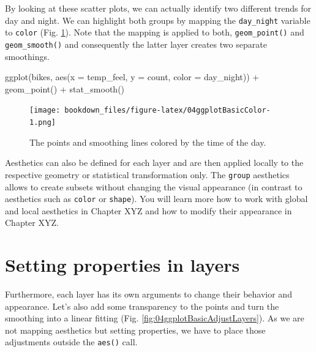 \documentclass[
]{krantz}
\makeatletter
\newenvironment{Shaded}{\begin{snugshade}}{\end{snugshade}}
\newcommand{\AttributeTok}[1]{\textcolor[rgb]{0.61,0.61,0.61}{#1}}
\newcommand{\FunctionTok}[1]{\textcolor[rgb]{0,0,0}{#1}}
\newcommand{\NormalTok}[1]{#1}
\newcommand{\SpecialCharTok}[1]{\textcolor[rgb]{0,0,0}{#1}}
\newenvironment{kframe}{%
\medskip{}
\setlength{\fboxsep}{.8em}
 \def\at@end@of@kframe{}%
 \ifinner\ifhmode%
  \def\at@end@of@kframe{\end{minipage}}%
  \begin{minipage}{\columnwidth}%
 \fi\fi%
 \def\FrameCommand##1{\hskip\@totalleftmargin \hskip-\fboxsep
 \colorbox{shadecolor}{##1}\hskip-\fboxsep
     \hskip-\linewidth \hskip-\@totalleftmargin \hskip\columnwidth}%
 \MakeFramed {\advance\hsize-\width
   \@totalleftmargin\z@ \linewidth\hsize
   \@setminipage}}%
 {\par\unskip\endMakeFramed%
 \at@end@of@kframe}
\renewenvironment{Shaded}{\begin{kframe}}{\end{kframe}}
\makeatother
\begin{document}
By looking at these scatter plots, we can actually identify two different trends for day and night. We can highlight both groups by mapping the \texttt{day\_night} variable to \texttt{color} (Fig. \ref{fig:04ggplotBasicColor}). Note that the mapping is applied to both, \texttt{geom\_point()} and \texttt{geom\_smooth()} and consequently the latter layer creates two separate smoothings.

\begin{Shaded}
\begin{Highlighting}[]
\FunctionTok{ggplot}\NormalTok{(bikes, }\FunctionTok{aes}\NormalTok{(}\AttributeTok{x =}\NormalTok{ temp\_feel, }\AttributeTok{y =}\NormalTok{ count, }\AttributeTok{color =}\NormalTok{ day\_night)) }\SpecialCharTok{+} 
  \FunctionTok{geom\_point}\NormalTok{() }\SpecialCharTok{+} 
  \FunctionTok{stat\_smooth}\NormalTok{()}
\end{Highlighting}
\end{Shaded}

\begin{figure}
\centering
\texttt{[image: bookdown\_files/figure-latex/04ggplotBasicColor-1.png]}
\caption{\label{fig:04ggplotBasicColor}The points and smoothing lines colored by the time of the day.}
\end{figure}

Aesthetics can also be defined for each layer and are then applied locally to the respective geometry or statistical transformation only. The \texttt{group} aesthetics allows to create subsets without changing the visual appearance (in contrast to aesthetics such as \texttt{color} or \texttt{shape}).
You will learn more how to work with global and local aesthetics in Chapter XYZ and how to modify their appearance in Chapter XYZ.

\hypertarget{set-properties}{%
\section{Setting properties in layers}\label{set-properties}}

Furthermore, each layer has its own arguments to change their behavior and appearance. Let's also add some transparency to the points and turn the smoothing into a linear fitting (Fig. \ref{fig:04ggplotBasicAdjustLayers}). As we are not mapping aesthetics but setting properties, we have to place those adjustments outside the \texttt{aes()} call.
\end{document}
